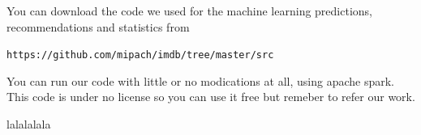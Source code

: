 \documentclass[letterpaper,twocolumn,10pt]{article}
\begin{document}
You can download the code we used for the machine learning predictions, recommendations and statistics from

\begin{center}
{\tt https://github.com/mipach/imdb/tree/master/src}\\
\end{center}

You can run our code with little or no modications at all, using apache spark. This code is under no license so you can use it free but remeber to refer our work.


{\footnotesize 
}
lalalalala
\end{document}
